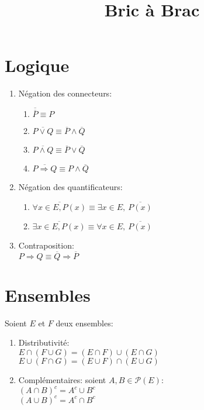 \documentclass[fleqn]{article}
\title{Bric \`a Brac}
\date{}
\theoremstyle{definition} \newtheorem*{defi}{D\'efinition}
\theoremstyle{definition} \newtheorem*{theo}{Th\'eor\`eme}
\theoremstyle{definition} \newtheorem*{coro}{Corollaire}
\theoremstyle{remark} \newtheorem*{rqs}{Remarques}
\theoremstyle{definition} \newtheorem*{prop}{Propri\'et\'e}
\begin{document}
\maketitle

\section{Logique}
\begin{enumerate}
	\item N\'egation des connecteurs:
		\begin{enumerate}
			\item  $\overline{\overline{P}} \equiv  P$
			\item  $\overline{P \lor Q} \equiv \overline{P} \land \overline{Q}$
			\item  $\overline{P \land Q} \equiv \overline{P} \lor \overline{Q}$
			\item  $\overline{P \Rightarrow Q} \equiv P \land \overline{Q}$
		\end{enumerate}
	\item N\'egation des quantificateurs:
		\begin{enumerate}
			\item $\overline{\forall x \in E, P(x)} \equiv \exists x \in E,\ \overline{P(x)}$
			\item $\overline{\exists x \in E, P(x)} \equiv \forall x \in E,\ \overline{P(x)}$
		\end{enumerate}
	\item Contraposition: \\
		$P \Rightarrow Q \equiv \overline{Q} \Rightarrow \overline{P}$
\end{enumerate}

\section{Ensembles}
Soient $E$ et $F$ deux ensembles:
\begin{enumerate}
	\item Distributivit\'e: \\
		\(E \cap(F \cup G) = (E \cap F) \cup (E \cap G)\) \\
		\(E \cup (F \cap G) = (E \cup F) \cap (E \cup G)\)
	\item Compl\'ementaires: soient \(A, B \in \mathcal{P}(E)\): \\
		\((A \cap B)^c = A^c \cup B^c\) \\
		\((A \cup B)^c = A^c \cap B^c\)
\end{enumerate}
\end{document}
